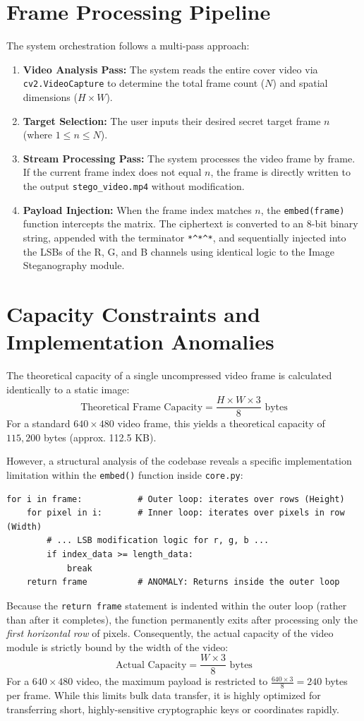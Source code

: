 \documentclass[12pt,a4paper]{report}
\begin{document}
\section{Frame Processing Pipeline}
The system orchestration follows a multi-pass approach:
\begin{enumerate}
    \item \textbf{Video Analysis Pass:} The system reads the entire cover video via \texttt{cv2.VideoCapture} to determine the total frame count ($N$) and spatial dimensions ($H \times W$).
    \item \textbf{Target Selection:} The user inputs their desired secret target frame $n$ (where $1 \le n \le N$).
    \item \textbf{Stream Processing Pass:} The system processes the video frame by frame. If the current frame index does not equal $n$, the frame is directly written to the output \texttt{stego\_video.mp4} without modification.
    \item \textbf{Payload Injection:} When the frame index matches $n$, the \texttt{embed(frame)} function intercepts the matrix. The ciphertext is converted to an 8-bit binary string, appended with the terminator \texttt{*\^{}*\^{}*}, and sequentially injected into the LSBs of the R, G, and B channels using identical logic to the Image Steganography module.
\end{enumerate}

\section{Capacity Constraints and Implementation Anomalies}
The theoretical capacity of a single uncompressed video frame is calculated identically to a static image:
$$\text{Theoretical Frame Capacity} = \frac{H \times W \times 3}{8} \text{ bytes}$$
For a standard $640 \times 480$ video frame, this yields a theoretical capacity of $115,200$ bytes (approx. 112.5 KB). 

However, a structural analysis of the codebase reveals a specific implementation limitation within the \texttt{embed()} function inside \texttt{core.py}:
\begin{lstlisting}[style=pythonstyle, caption={Premature Return Anomaly in embed()}]
for i in frame:           # Outer loop: iterates over rows (Height)
    for pixel in i:       # Inner loop: iterates over pixels in row (Width)
        # ... LSB modification logic for r, g, b ...
        if index_data >= length_data:
            break
    return frame          # ANOMALY: Returns inside the outer loop
\end{lstlisting}
Because the \texttt{return frame} statement is indented within the outer loop (rather than after it completes), the function permanently exits after processing only the \textit{first horizontal row} of pixels. 
Consequently, the actual capacity of the video module is strictly bound by the width of the video:
$$\text{Actual Capacity} = \frac{W \times 3}{8} \text{ bytes}$$
For a $640 \times 480$ video, the maximum payload is restricted to $\frac{640 \times 3}{8} = 240$ bytes per frame. While this limits bulk data transfer, it is highly optimized for transferring short, highly-sensitive cryptographic keys or coordinates rapidly.
\end{document}
